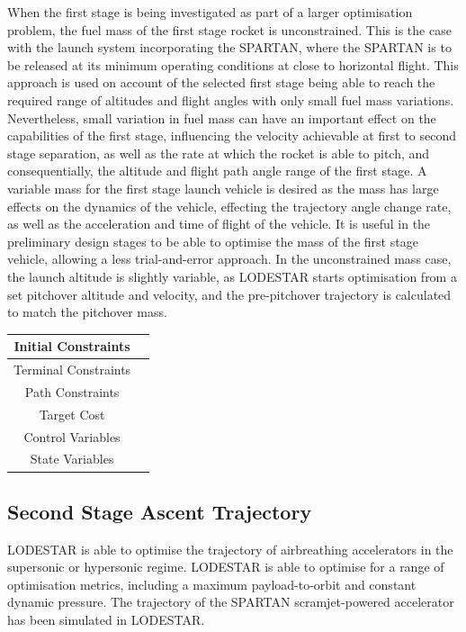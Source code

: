 When the first stage is being investigated as part of a larger optimisation problem, the fuel mass of the first stage rocket is unconstrained.
 This is the case with the launch system incorporating the SPARTAN, where the SPARTAN is to be released at its minimum operating conditions at close to horizontal flight. 
This approach is used on account of the selected first stage being able to reach the required range of altitudes and flight angles with only small fuel mass variations. 
Nevertheless, small variation in fuel mass can have an important effect on the capabilities of the first stage, influencing the velocity achievable at first to second stage separation, as well as the rate at which the rocket is able to pitch, and consequentially, the altitude and flight path angle range of the first stage.
A variable mass for the first stage launch vehicle is desired as the mass has large effects on the dynamics of the vehicle, effecting the trajectory angle change rate, as well as the acceleration and time of flight of the vehicle.
It is useful in the preliminary design stages to be able to optimise the mass of the first stage vehicle, allowing a less trial-and-error approach.
In the unconstrained mass case, the launch altitude is slightly variable, as LODESTAR starts optimisation from a set pitchover altitude and velocity, and the pre-pitchover trajectory is calculated to match the pitchover mass. 





\begin{tabular}{|c|c|}
	\hline Initial Constraints  & \\ 
	\hline Terminal Constraints &  \\ 
	\hline Path Constraints &  \\ 
	\hline Target Cost &  \\ 
		\hline Control Variables &  \\ 
		\hline State Variables &  \\ 
	\hline 
\end{tabular} 



\subsection{Second Stage Ascent Trajectory}




LODESTAR is able to optimise the trajectory of airbreathing accelerators in the supersonic or hypersonic regime. LODESTAR is able to optimise for a range of optimisation metrics, including a maximum payload-to-orbit and constant dynamic pressure.  
The trajectory of the SPARTAN scramjet-powered accelerator has been simulated in LODESTAR. 

